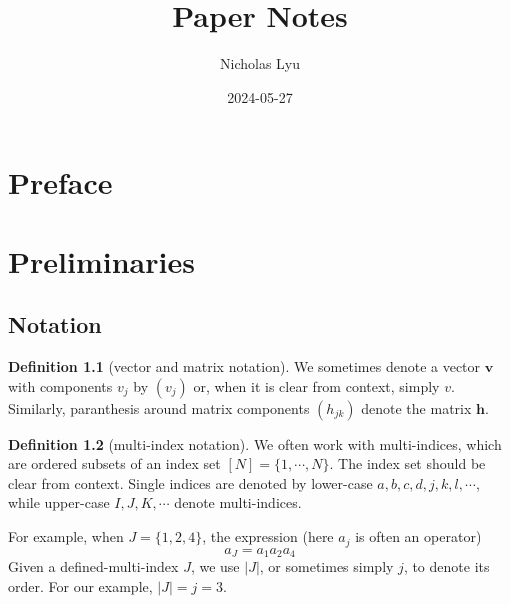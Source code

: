 \documentclass[
]{book}
\title{Paper Notes}
\author{Nicholas Lyu}
\date{2024-05-27}
\theoremstyle{definition}
\newtheorem{definition}{Definition}[chapter]
\theoremstyle{definition}
\theoremstyle{definition}
\theoremstyle{definition}
\theoremstyle{remark}
\begin{document}
\maketitle

{
\setcounter{tocdepth}{1}
\tableofcontents
}
\usepackage{cancel}
\newcommand{\pd}[1]{\partial_{#1}}

\newcommand{\mbb}{\mathbb}
\newcommand{\mbf}{\mathbf}
\newcommand{\mrm}{\mathrm}
\newcommand{\mca}{\mathcal}
\newcommand{\mfk}{\mathfrak}

\newcommand{\tr}{\mrm{tr}} 
\newcommand{\df}{\dfrac}
\newcommand{\la}{\langle}
\newcommand{\ra}{\rangle}
\newcommand{\dag}{\dagger}

\newcommand{\Cl}{\mca C}
\newcommand{\Gr}{\mca G}
\newcommand{\Pf}{\mrm{Pf}}
\newcommand{\Pa}{\mca P}

\newcommand{\poly}{\mrm{poly}}

\chapter*{Preface}\label{preface}

\chapter{Preliminaries}\label{preliminaries}

\section{Notation}\label{notation}

\begin{definition}[vector and matrix notation]
\protect\hypertarget{def:vecmatnot}{}\label{def:vecmatnot}We sometimes denote a vector \(\mathbf v\) with components \(v_j\) by \((v_j)\) or,
when it is clear from context, simply \(v\).
Similarly, paranthesis around matrix components \((h_{jk})\) denote
the matrix \(\mathbf h\).
\end{definition}

\begin{definition}[multi-index notation]
\protect\hypertarget{def:multiindex}{}\label{def:multiindex}We often work with multi-indices, which are ordered subsets of an index set
\([N]=\{1, \cdots, N\}\). The index set should be clear from context.
Single indices are denoted by lower-case
\(a, b, c, d, j, k, l, \cdots\), while upper-case \(I, J, K, \cdots\)
denote multi-indices.

For example, when \(J=\{1, 2, 4\}\), the expression (here \(a_j\) is often an operator)
\[ 
    a_J = a_1a_2a_4 
\]
Given a defined-multi-index \(J\), we use \(|J|\), or sometimes simply \(j\), to
denote its order. For our example, \(|J|=j=3\).
\end{definition}
\end{document}
